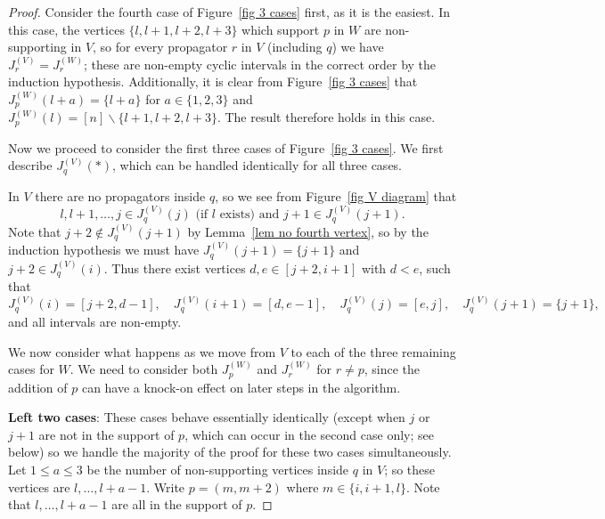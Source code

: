 \documentclass[11pt]{article}
\theoremstyle{remark}
\theoremstyle{definition}
\begin{document}
\begin{proof}
Consider the fourth case of Figure~\ref{fig 3 cases} first, as it is the easiest.  In this case, the vertices $\{l,l+1,l+2,l+3 \}$ which support $p$ in $W$ are non-supporting in $V$, so for every propagator $r$ in $V$ (including $q$) we have $J_r^{(V)} = J_r^{(W)}$; these are non-empty cyclic intervals in the correct order by the induction hypothesis.  Additionally, it is clear from Figure~\ref{fig 3 cases} that $J_p^{(W)}(l+a) = \{l+a\}$ for $a\in\{1,2,3\}$ and $J_p^{(W)}(l) = [n] \backslash \{l+1, l+2, l+3\}$. The result therefore holds in this case.


Now we proceed to consider the first three cases of Figure~\ref{fig 3 cases}.
We first describe $J_q^{(V)}(*)$, which can be handled identically for all three cases.

In $V$ there are no propagators inside $q$, so we see from Figure~\ref{fig V diagram} that
\[l, l+1, \ldots ,j \in J^{(V)}_q(j) \text{ (if $l$ exists) and }  j+1 \in J^{(V)}_q(j+1).\]
Note that $j+2 \not\in J^{(V)}_q(j+1)$ by Lemma~\ref{lem no fourth vertex}, so by the induction hypothesis we must have $J^{(V)}_q(j+1) = \{j+1\}$ and $j+2 \in J^{(V)}_q(i)$. Thus there exist vertices $d,e \in [j+2,i+1]$ with $d <e$, such that
\[J^{(V)}_q(i) = [j+2,d-1], \quad J^{(V)}_q(i+1) = [d,e-1], \quad J^{(V)}_q(j) = [e,j], \quad J^{(V)}_q(j+1) = \{j+1\},\]
and all intervals are non-empty.




We now consider what happens as we move from $V$ to each of the three remaining cases for $W$. We need to consider both $J^{(W)}_p$ and $J^{(W)}_r$ for $r \neq p$, since the addition of $p$ can have a knock-on effect on later steps in the algorithm.


\textbf{Left two cases}: These cases behave essentially identically (except when $j$ or $j+1$ are not in the support of $p$, which can occur in the second case only; see below) so we handle the majority of the proof for these two cases simultaneously. Let $1\leq a\leq 3$ be the number of non-supporting vertices inside $q$ in $V$; so these vertices are $l, \ldots, l+a-1$.  Write $p=(m,m+2)$ where $m\in \{i, i+1, l\}$.  Note that $l, \ldots, l+a-1$ are all in the support of $p$.


\end{proof}
\end{document}
